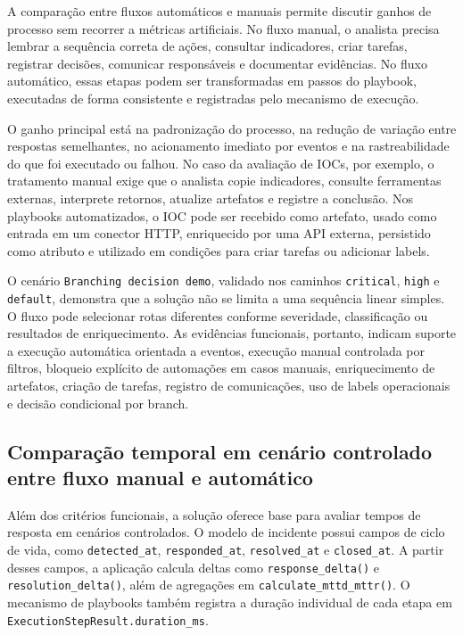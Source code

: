 \documentclass[article,a4paper,12pt,english,brazil,sumario=tradicional]{abntex2}
\begin{document}
A comparação entre fluxos automáticos e manuais permite discutir ganhos de processo sem recorrer a métricas artificiais. No fluxo manual, o analista precisa lembrar a sequência correta de ações, consultar indicadores, criar tarefas, registrar decisões, comunicar responsáveis e documentar evidências. No fluxo automático, essas etapas podem ser transformadas em passos do playbook, executadas de forma consistente e registradas pelo mecanismo de execução.

O ganho principal está na padronização do processo, na redução de variação entre respostas semelhantes, no acionamento imediato por eventos e na rastreabilidade do que foi executado ou falhou. No caso da avaliação de IOCs, por exemplo, o tratamento manual exige que o analista copie indicadores, consulte ferramentas externas, interprete retornos, atualize artefatos e registre a conclusão. Nos playbooks automatizados, o IOC pode ser recebido como artefato, usado como entrada em um conector HTTP, enriquecido por uma API externa, persistido como atributo e utilizado em condições para criar tarefas ou adicionar labels.

O cenário \texttt{Branching decision demo}, validado nos caminhos \texttt{critical}, \texttt{high} e \texttt{default}, demonstra que a solução não se limita a uma sequência linear simples. O fluxo pode selecionar rotas diferentes conforme severidade, classificação ou resultados de enriquecimento. As evidências funcionais, portanto, indicam suporte a execução automática orientada a eventos, execução manual controlada por filtros, bloqueio explícito de automações em casos manuais, enriquecimento de artefatos, criação de tarefas, registro de comunicações, uso de labels operacionais e decisão condicional por branch.

\subsection{Comparação temporal em cenário controlado entre fluxo manual e automático}

Além dos critérios funcionais, a solução oferece base para avaliar tempos de resposta em cenários controlados. O modelo de incidente possui campos de ciclo de vida, como \texttt{detected\_at}, \texttt{responded\_at}, \texttt{resolved\_at} e \texttt{closed\_at}. A partir desses campos, a aplicação calcula deltas como \texttt{response\_delta()} e \texttt{resolution\_delta()}, além de agregações em \texttt{calculate\_mttd\_mttr()}. O mecanismo de playbooks também registra a duração individual de cada etapa em \texttt{ExecutionStepResult.duration\_ms}.
\end{document}
